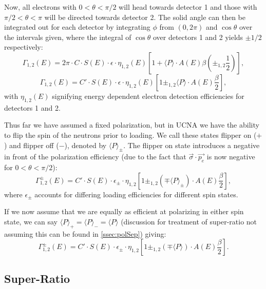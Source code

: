 Now, all electrons with $0 < \theta < \pi/2$ will head towards detector 1 and those 
with $\pi/2 < \theta < \pi$ will be directed towards detector 2. The solid angle can
then be integrated out for each detector by integrating $\phi$ from $(0,2\pi)$ and
$\cos\theta$ over the intervals given, where the integral of $\cos\theta$ over detectors
1 and 2 yields $\pm1/2$ respectively: 
%
\begin{equation} 
  \Gamma_{1,2}\left(E\right)= 2\pi \cdot C \cdot S(E) \cdot
  \epsilon \cdot \eta_{1,2}(E) \left[ 1+ \langle P \rangle\cdot A(E)\beta
    \left(\pm_{1,2}\frac{1}{2}\right) \right],
\end{equation} 
%
\begin{equation} 
  \Gamma_{1,2}\left(E\right)=C' \cdot S(E) \cdot \epsilon \cdot \eta_{1,2}(E)
  \left[ 1 \pm_{1,2} \langle P \rangle\cdot A(E) \frac{\beta}{2} \right],
\end{equation} 
%
\noindent with $\eta_{1,2}(E)$ signifying energy dependent electron
detection efficiencies for detectors 1 and 2. 

Thus far we have assumed a fixed polarization, but in UCNA we have the ability to 
flip the spin of the neutrons prior to loading. We call these states flipper on ($+$) 
and flipper off ($-$), denoted by $\langle P \rangle_{\pm}$. The flipper on state introduces a
negative in front of the polarization efficiency
(due to the fact that $\vec{\sigma}\cdot\vec{p_{e}}$ is now negative for $0 < \theta < \pi/2$):
%
\begin{equation}
  \Gamma_{1,2}^{\pm}\left(E\right)=C' \cdot S(E) \cdot \epsilon_{\pm} \cdot \eta_{1,2}
  \left[ 1 \pm_{1,2} 
\left(\mp \langle P \rangle_{\pm}\right) \cdot A(E) \frac{\beta}{2} \right],
\end{equation} 
%
\noindent where $\epsilon_{\pm}$ accounts for differing loading efficiencies for 
different spin states.

If we now assume that we are equally as efficient at polarizing in either spin state, we
can say $\langle P \rangle_{+}=\langle P \rangle_{-}=\langle P \rangle$ (discussion
for treatment of super-ratio not assuming this can be found in \ref{ssec:polSep}) giving:
%
\begin{equation} \label{eq:decayRate}
  \Gamma_{1,2}^{\pm}\left(E\right)=C' \cdot S(E) \cdot \epsilon_{\pm} \cdot \eta_{1,2}
  \left[ 1 \pm_{1,2} 
    \left(\mp \langle P \rangle \right) \cdot A(E) \frac{\beta}{2} \right].
\end{equation}
%

\subsection{Super-Ratio}

